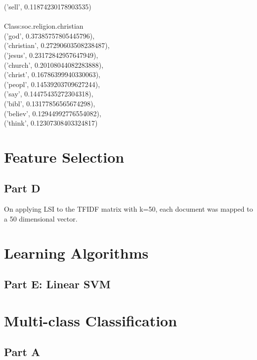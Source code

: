 \documentclass[11pt]{article}
\begin{document}
('sell', 0.11874230178903535) \\
\\
Class:soc.religion.christian\\
('god', 0.37385757805445796),\\ ('christian', 0.27290603508238487),\\ ('jesus', 0.23172842957647949),\\ ('church', 0.20108044082283888),\\ ('christ', 0.16786399940330063),\\ ('peopl', 0.14539203709627244),\\ ('say', 0.14475435272304318),\\ ('bibl', 0.13177856565674298),\\ ('believ', 0.12944992776554082),\\ ('think', 0.12307308403324817)\\


\section{Feature Selection}
\subsection{Part D}
On applying LSI to the TFIDF matrix with k=50, each document was mapped to a 50 dimensional vector. 

\section{Learning Algorithms}
\subsection{Part E: Linear SVM}


\section{Multi-class Classification}
\subsection{Part A}
\end{document}
